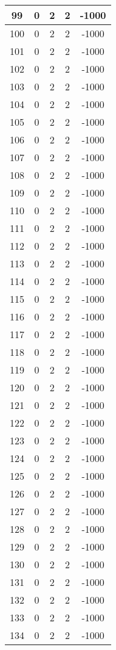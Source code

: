\documentclass[letterpaper, 12pt]{article}
\begin{document}
\begin{longtable}{|c|c|c|c|c|}
\hline
99 & 0 & 2 & 2 & -1000 \\
\hline
100 & 0 & 2 & 2 & -1000 \\
\hline
101 & 0 & 2 & 2 & -1000 \\
\hline
102 & 0 & 2 & 2 & -1000 \\
\hline
103 & 0 & 2 & 2 & -1000 \\
\hline
104 & 0 & 2 & 2 & -1000 \\
\hline
105 & 0 & 2 & 2 & -1000 \\
\hline
106 & 0 & 2 & 2 & -1000 \\
\hline
107 & 0 & 2 & 2 & -1000 \\
\hline
108 & 0 & 2 & 2 & -1000 \\
\hline
109 & 0 & 2 & 2 & -1000 \\
\hline
110 & 0 & 2 & 2 & -1000 \\
\hline
111 & 0 & 2 & 2 & -1000 \\
\hline
112 & 0 & 2 & 2 & -1000 \\
\hline
113 & 0 & 2 & 2 & -1000 \\
\hline
114 & 0 & 2 & 2 & -1000 \\
\hline
115 & 0 & 2 & 2 & -1000 \\
\hline
116 & 0 & 2 & 2 & -1000 \\
\hline
117 & 0 & 2 & 2 & -1000 \\
\hline
118 & 0 & 2 & 2 & -1000 \\
\hline
119 & 0 & 2 & 2 & -1000 \\
\hline
120 & 0 & 2 & 2 & -1000 \\
\hline
121 & 0 & 2 & 2 & -1000 \\
\hline
122 & 0 & 2 & 2 & -1000 \\
\hline
123 & 0 & 2 & 2 & -1000 \\
\hline
124 & 0 & 2 & 2 & -1000 \\
\hline
125 & 0 & 2 & 2 & -1000 \\
\hline
126 & 0 & 2 & 2 & -1000 \\
\hline
127 & 0 & 2 & 2 & -1000 \\
\hline
128 & 0 & 2 & 2 & -1000 \\
\hline
129 & 0 & 2 & 2 & -1000 \\
\hline
130 & 0 & 2 & 2 & -1000 \\
\hline
131 & 0 & 2 & 2 & -1000 \\
\hline
132 & 0 & 2 & 2 & -1000 \\
\hline
133 & 0 & 2 & 2 & -1000 \\
\hline
134 & 0 & 2 & 2 & -1000 \\

\end{longtable}
\end{document}
